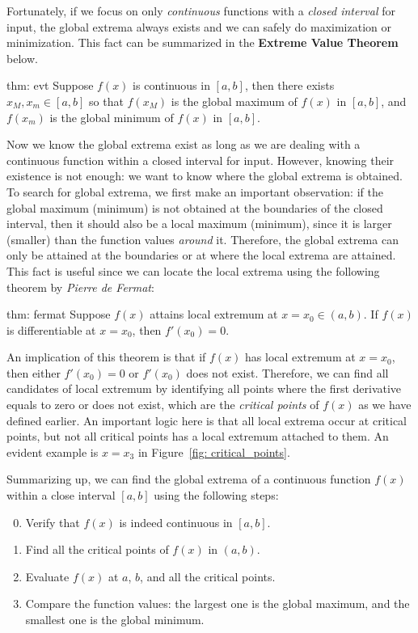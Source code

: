 Fortunately, if we focus on only \textit{continuous} functions with a \textit{closed interval} for input, the global extrema always exists and we can safely do maximization or minimization.  This fact can be summarized in the \textbf{Extreme Value Theorem} below.

\begin{theo}{thm: evt}
    Suppose $f(x)$ is continuous in $[a, b]$, then there exists $x_M, x_m \in [a, b]$ so that $f(x_M)$ is the global maximum of $f(x)$ in $[a, b]$, and $f(x_m)$ is the global minimum of $f(x)$ in $[a, b]$. 
\end{theo}

Now we know the global extrema exist as long as we are dealing with a continuous function within a closed interval for input.  However, knowing their existence is not enough: we want to know where the global extrema is obtained.  To search for global extrema, we first make an important observation: if the global maximum (minimum) is not obtained at the boundaries of the closed interval, then it should also be a local maximum (minimum), since it is larger (smaller) than the function values \textit{around} it.  Therefore, the global extrema can only be attained at the boundaries or at where the local extrema are attained.  This fact is useful since we can locate the local extrema using the following theorem by \textit{Pierre de Fermat}:

\begin{theo}{thm: fermat}
    Suppose $f(x)$ attains local extremum at $x=x_0 \in (a, b)$.  If $f(x)$ is differentiable at $x = x_0$, then $f'(x_0) = 0$.
\end{theo}

An implication of this theorem is that if $f(x)$ has local extremum at $x = x_0$, then either $f'(x_0)=0$ or $f'(x_0)$ does not exist.  Therefore, we can find all candidates of local extremum by identifying all points where the first derivative equals to zero or does not exist, which are the \textit{critical points} of $f(x)$ as we have defined earlier.  An important logic here is that all local extrema occur at critical points, but not all critical points has a local extremum attached to them.  An evident example is $x=x_3$ in Figure~\ref{fig: critical_points}.

Summarizing up, we can find the global extrema of a continuous function $f(x)$ within a close interval $[a, b]$ using the following steps:

\begin{enumerate}
    \setcounter{enumi}{-1}
    \item Verify that $f(x)$ is indeed continuous in $[a, b]$.
    \item Find all the critical points of $f(x)$ in $(a, b)$.
    \item Evaluate $f(x)$ at $a$, $b$, and all the critical points.
    \item Compare the function values: the largest one is the global maximum, and the smallest one is the global minimum.
\end{enumerate}

